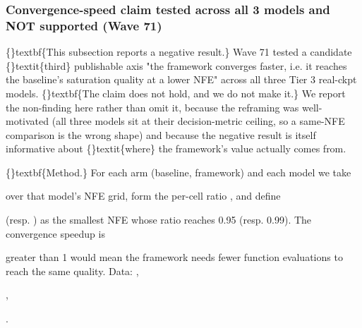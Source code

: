 \documentclass{article}
\begin{document}
\subsubsection{Convergence-speed claim  tested across all 3 models and NOT supported (Wave 71)}
\{\}textbf\{This subsection reports a negative result.\} Wave 71 tested a candidate \{\}textit\{third\} publishable axis  "the framework converges faster, i.e. it reaches the baseline's saturation quality at a lower NFE"  across all three Tier 3 real-ckpt models. \{\}textbf\{The claim does not hold, and we do not make it.\} We report the non-finding here rather than omit it, because the reframing was well-motivated (all three models sit at their decision-metric ceiling, so a same-NFE comparison is the wrong shape) and because the negative result is itself informative about \{\}textit\{where\} the framework's value actually comes from.

\{\}textbf\{Method.\} For each arm (baseline, framework) and each model we take

 over that model's NFE grid, form the per-cell ratio , and define

 (resp. ) as the smallest NFE whose ratio reaches 0.95 (resp. 0.99). The convergence speedup is

  greater than 1 would mean the framework needs fewer function evaluations to reach the same quality. Data: ,

,

.

\begin{table}[ht]
\centering
\small
{}
\end{table}
\end{document}
